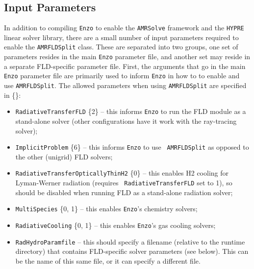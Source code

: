 \documentclass[letterpaper,10pt]{article}
\renewcommand{\(}{\left(}
\renewcommand{\)}{\right)}
\newcommand{\amrsolve}{{\tt AMRSolve} }
\newcommand{\enzo}{{\tt Enzo} }
\newcommand{\hypre}{{\tt HYPRE} }
\begin{document}
\subsection{Input Parameters}
\label{sec:AMRFLDSplit_parameters}

In addition to compiling \enzo to enable the \amrsolve framework and
the \hypre linear solver library, there are a small number of
input parameters required to enable the {\tt AMRFLDSplit} class.
These are separated into two groups, one set of parameters resides in
the main \enzo parameter file, and another set may reside in a
separate FLD-specific parameter file.  First, the arguments that go in
the main \enzo parameter file are primarily used to inform \enzo in
how to to enable and use {\tt AMRFLDSplit}.  The allowed parameters
when using {\tt AMRFLDSplit} are specified in \{\}:
\begin{itemize}
\item {\tt RadiativeTransferFLD} \{2\} -- this informs \enzo to run the
  FLD module as a stand-alone solver (other configurations have it
  work with the ray-tracing solver);
\item {\tt ImplicitProblem} \{6\} -- this informs \enzo to use {\tt
  AMRFLDSplit} as opposed to the other (unigrid) FLD solvers;
\item {\tt RadiativeTransferOpticallyThinH2} \{0\} -- this enables H2
  cooling for Lyman-Werner radiation (requires {\tt
    RadiativeTransferFLD} set to 1), so should be disabled when
  running FLD as a stand-alone radiation solver;
\item {\tt MultiSpecies} \{0, 1\} -- this enables {\tt Enzo}'s chemistry
  solvers;
\item {\tt RadiativeCooling} \{0, 1\} -- this enables {\tt Enzo}'s gas
  cooling solvers;
\item {\tt RadHydroParamfile} -- this should specify a filename
  (relative to the runtime directory) that contains FLD-specific
  solver parameters (see below).  This can be the name of this same
  file, or it can specify a different file.
\end{itemize}
\end{document}
